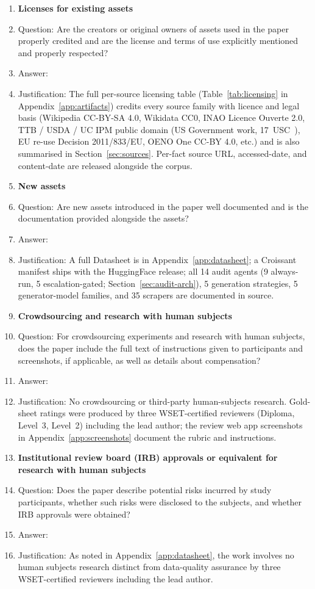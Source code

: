 \begin{enumerate}
\item {\bf Licenses for existing assets}
    \item[] Question: Are the creators or original owners of assets used in the paper properly credited and are the license and terms of use explicitly mentioned and properly respected?
    \item[] Answer: \answerYes{}
    \item[] Justification: The full per-source licensing table (Table~\ref{tab:licensing} in Appendix~\ref{app:artifacts}) credits every source family with licence and legal basis (Wikipedia CC-BY-SA 4.0, Wikidata CC0, INAO Licence Ouverte 2.0, TTB / USDA / UC IPM public domain (US Government work, 17~USC~), EU re-use Decision 2011/833/EU, OENO One CC-BY 4.0, etc.) and is also summarised in Section~\ref{sec:sources}. Per-fact source URL, accessed-date, and content-date are released alongside the corpus.

\item {\bf New assets}
    \item[] Question: Are new assets introduced in the paper well documented and is the documentation provided alongside the assets?
    \item[] Answer: \answerYes{}
    \item[] Justification: A full Datasheet is in Appendix~\ref{app:datasheet}; a Croissant manifest \citep{koehn2024croissant} ships with the HuggingFace release; all 14 audit agents (9 always-run, 5 escalation-gated; Section~\ref{sec:audit-arch}), 5 generation strategies, 5 generator-model families, and 35 scrapers are documented in source.

\item {\bf Crowdsourcing and research with human subjects}
    \item[] Question: For crowdsourcing experiments and research with human subjects, does the paper include the full text of instructions given to participants and screenshots, if applicable, as well as details about compensation?
    \item[] Answer: \answerNA{}
    \item[] Justification: No crowdsourcing or third-party human-subjects research. Gold-sheet ratings were produced by three WSET-certified reviewers (Diploma, Level~3, Level~2) including the lead author; the review web app screenshots in Appendix~\ref{app:screenshots} document the rubric and instructions.

\item {\bf Institutional review board (IRB) approvals or equivalent for research with human subjects}
    \item[] Question: Does the paper describe potential risks incurred by study participants, whether such risks were disclosed to the subjects, and whether IRB approvals were obtained?
    \item[] Answer: \answerNA{}
    \item[] Justification: As noted in Appendix~\ref{app:datasheet}, the work involves no human subjects research distinct from data-quality assurance by three WSET-certified reviewers including the lead author.


\end{enumerate}
